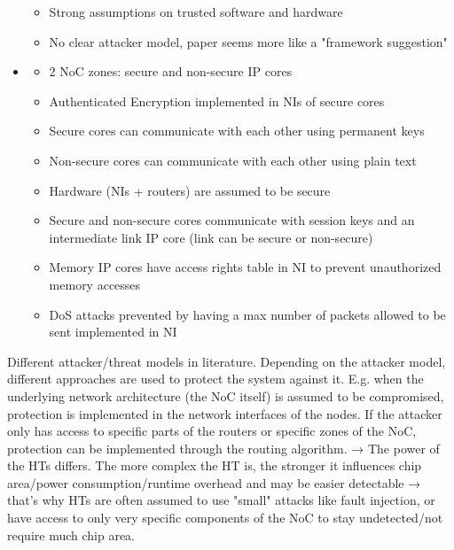 \documentclass[
	paper=a4,
	fontsize=11pt,
	parskip=full %
]{scrreprt}
\begin{document}
\begin{itemize}
\begin{itemize}
                \item Strong assumptions on trusted software and hardware
                \item No clear attacker model, paper seems more like a "framework suggestion"
            \end{itemize}
        \item \textbf{}
            \begin{itemize}
                \item 2 NoC zones: secure and non-secure IP cores
                \item Authenticated Encryption implemented in NIs of secure cores
                \item Secure cores can communicate with each other using permanent keys
                \item Non-secure cores can communicate with each other using plain text
                \item Hardware (NIs + routers) are assumed to be secure
                \item Secure and non-secure cores communicate with session keys and an intermediate link IP core (link can be secure or non-secure)
                \item Memory IP cores have access rights table in NI to prevent unauthorized memory accesses
                \item DoS attacks prevented by having a max number of packets allowed to be sent implemented in NI
            \end{itemize}
    \end{itemize}

    Different attacker/threat models in literature. Depending on the attacker model, different approaches are used to protect the system against it.
    E.g. when the underlying network architecture (the NoC itself) is assumed to be compromised, protection is implemented in the network interfaces
    of the nodes. If the attacker only has access to specific parts of the routers or specific zones of the NoC, protection can be implemented through
    the routing algorithm. → The power of the HTs differs. The more complex the HT is, the stronger it influences chip area/power consumption/runtime
    overhead and may be easier detectable → that's why HTs are often assumed to use "small" attacks like fault injection, or have access to only very
    specific components of the NoC to stay undetected/not require much chip area.
\end{document}
